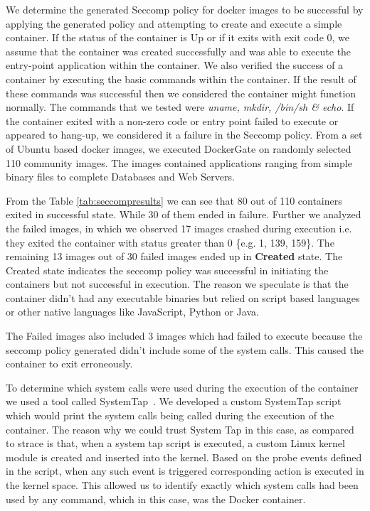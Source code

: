 We determine the generated Seccomp policy for docker images to be successful by applying the generated policy and attempting to create and execute a simple container. If the status of the container is Up or if it exits with exit code 0, we assume that the container was created successfully and was able to execute the entry-point application within the container. We also verified the success of a container by executing the basic commands within the container. If the result of these commands was successful then we considered the container might function normally. The commands that we tested were \textit{uname, mkdir, /bin/sh \& echo}. If the container exited with a non-zero code or entry point failed to execute or appeared to hang-up, we considered it a failure in the Seccomp policy.
From a set of Ubuntu based docker images, we executed DockerGate on randomly selected 110 community images. The images contained applications ranging from simple binary files to complete Databases and Web Servers. 





From the Table \ref{tab:seccompresults} we can see that 80 out of 110 containers exited in successful state. While 30 of them ended in failure. Further we analyzed the failed images, in which we observed 17 images crashed during execution i.e. they exited the container with status greater than 0 \{e.g. 1, 139, 159\}. The remaining 13 images out of 30 failed images ended up in \textbf{Created} state. The Created state indicates the seccomp policy was successful in initiating the containers but not successful in execution. The reason  we speculate is that the container didn't had any executable binaries but relied on script based languages or other native languages like JavaScript, Python or Java.   

The Failed images also included 3 images which had failed to execute because the seccomp policy generated didn't include some of the system calls. This caused the container to exit erroneously.

To determine which system calls were used during the execution of the container we used a tool called SystemTap~\cite{systemtap}. We developed a custom SystemTap script which would print the system calls being called during the execution of the container. The reason why we could trust System Tap in this case, as compared to strace is that, when a system tap script is executed, a custom Linux kernel module is created and inserted into the kernel. Based on the probe events defined in the script, when any such event is triggered corresponding action is executed in the kernel space. This allowed us to identify exactly which system calls had been used by any command, which in this case, was the Docker container. 

